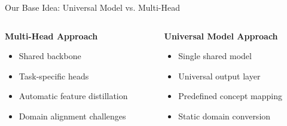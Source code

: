 \documentclass[aspectratio=169]{beamer}
\begin{document}
\begin{frame}{Our Base Idea: Universal Model vs. Multi-Head}
    \begin{columns}[T]
        \begin{column}{0.48\textwidth}
            \textbf{Multi-Head Approach}
            \begin{itemize}
                \item Shared backbone
                \item Task-specific heads
                \item Automatic feature distillation
                \item Domain alignment challenges
            \end{itemize}

            \begin{center}
            \end{center}
        \end{column}

        \begin{column}{0.48\textwidth}
            \textbf{Universal Model Approach}
            \begin{itemize}
                \item Single shared model
                \item Universal output layer
                \item Predefined concept mapping
                \item Static domain conversion
            \end{itemize}

            \begin{center}
\end{center}
\end{column}
\end{columns}
\end{frame}
\end{document}
